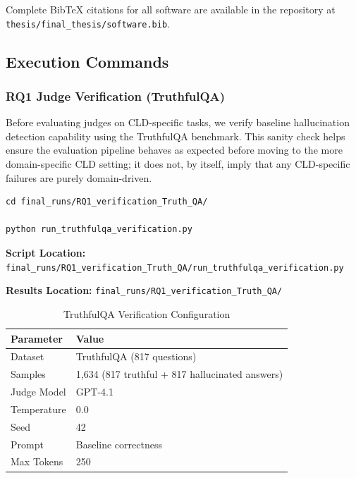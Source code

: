 \noindent Complete BibTeX citations for all software are available in the repository at \texttt{thesis/final\_thesis/software.bib}.

\subsection{Execution Commands}
\label{sec:execution_commands}

\subsubsection{RQ1 Judge Verification (TruthfulQA)}
\label{sec:truthqa_verification}

Before evaluating judges on CLD-specific tasks, we verify baseline hallucination detection capability using the TruthfulQA benchmark. This sanity check helps ensure the evaluation pipeline behaves as expected before moving to the more domain-specific CLD setting; it does not, by itself, imply that any CLD-specific failures are purely domain-driven.

\begin{verbatim}
cd final_runs/RQ1_verification_Truth_QA/

python run_truthfulqa_verification.py
\end{verbatim}

\textbf{Script Location:} \texttt{final\_runs/RQ1\_verification\_Truth\_QA/run\_truthfulqa\_verification.py}

\textbf{Results Location:} \texttt{final\_runs/RQ1\_verification\_Truth\_QA/}

\begin{table}[H]
\centering
\caption{TruthfulQA Verification Configuration}
\label{tab:truthqa_config}
\footnotesize
\begin{tabular}{@{}ll@{}}
\toprule
\textbf{Parameter} & \textbf{Value} \\
\midrule
Dataset & TruthfulQA (817 questions) \\
Samples & 1,634 (817 truthful + 817 hallucinated answers) \\
Judge Model & GPT-4.1 \\
Temperature & 0.0 \\
Seed & 42 \\
Prompt & Baseline correctness \\
Max Tokens & 250 \\
\bottomrule
\end{tabular}
\end{table}

